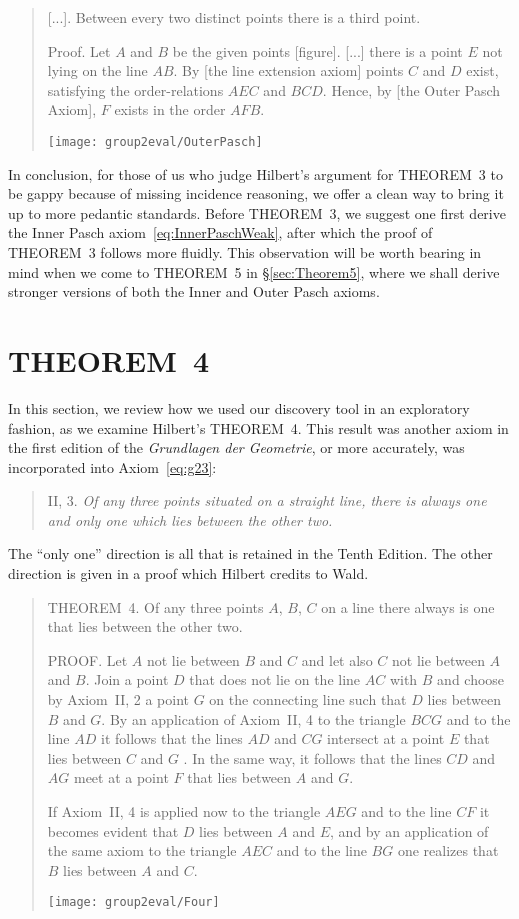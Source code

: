 \begin{quotation}\label{sec:VeblenThree}
[...]. Between every two distinct points there is a third point.

Proof. Let $A$ and $B$ be the given points [figure]. [...] there is a point $E$ not lying on the line $AB$. By [the line extension axiom] points $C$ and $D$ exist, satisfying the order-relations $AEC$ and $BCD$. Hence, by [the Outer Pasch Axiom], $F$ exists in the order $AFB$.
\vspace{0.5cm}

\centering\texttt{[image: group2eval/OuterPasch]}
\end{quotation}
In conclusion, for those of us who judge Hilbert's argument for THEOREM~3 to be gappy because of missing incidence reasoning, we offer a clean way to bring it up to more pedantic standards. Before THEOREM~3, we suggest one first derive the Inner Pasch axiom~\eqref{eq:InnerPaschWeak}, after which the proof of THEOREM~3 follows more fluidly. This observation will be worth bearing in mind when we come to THEOREM~5 in \S\ref{sec:Theorem5}, where we shall derive stronger versions of both the Inner and Outer Pasch axioms.

\section{THEOREM~4}
In this section, we review how we used our discovery tool in an exploratory fashion, as we examine Hilbert's THEOREM~4. This result was another axiom in the first edition of the \emph{Grundlagen der Geometrie}, or more accurately, was incorporated into Axiom~\ref{eq:g23}:
\begin{quotation}
  II, 3. \emph{Of any three points situated on a straight line, there is always one and only one which lies between the other two.}
\end{quotation}

The ``only one'' direction is all that is retained in the Tenth Edition. The other direction is given in a proof which Hilbert credits to Wald.
\begin{quotation}
  THEOREM~4. Of any three points $A$, $B$, $C$ on a line there always is one that lies between the other two.

  PROOF. Let $A$ not lie between $B$ and $C$ and let also $C$ not lie between $A$ and $B$. Join a point $D$ that does not lie on the line $AC$ with $B$ and choose by Axiom~II, 2 a point $G$ on the connecting line such that $D$ lies between $B$ and $G$. By an application of Axiom~II, 4 to the triangle $BCG$ and to the line $AD$ it follows that the lines $AD$ and $CG$ intersect at a point $E$ that lies between $C$ and $G$ . In the same way, it follows that the lines $CD$ and $AG$ meet at a point $F$ that lies between $A$ and $G$.

If Axiom~II, 4 is applied now to the triangle $AEG$ and to the line $CF$ it becomes evident that $D$ lies between $A$ and $E$, and by an application of the same axiom to the triangle $AEC$ and to the line $BG$ one realizes that $B$ lies between $A$ and $C$.

\centering \texttt{[image: group2eval/Four]}
\end{quotation}

